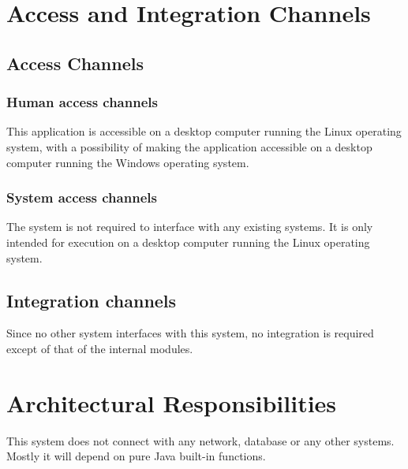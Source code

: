 \documentclass[12pt]{article}
\begin{document}


\newpage
\tableofcontents
\newpage


\section{Access and Integration Channels}
\subsection{Access Channels}
\subsubsection{Human access channels}

This application is accessible on a desktop computer running the Linux operating system, with a possibility of making the application accessible on a desktop computer running the Windows operating system.

\subsubsection{System access channels}
The system is not required to interface with any existing systems. It is only intended for execution on a desktop computer running the Linux operating system.

\subsection{Integration channels}
Since no other system interfaces with this system, no integration is required except of that of the internal modules.

\section{Architectural Responsibilities}

This system does not connect with any network, database or any other systems. Mostly it will depend on pure Java built-in functions.
\end{document}
